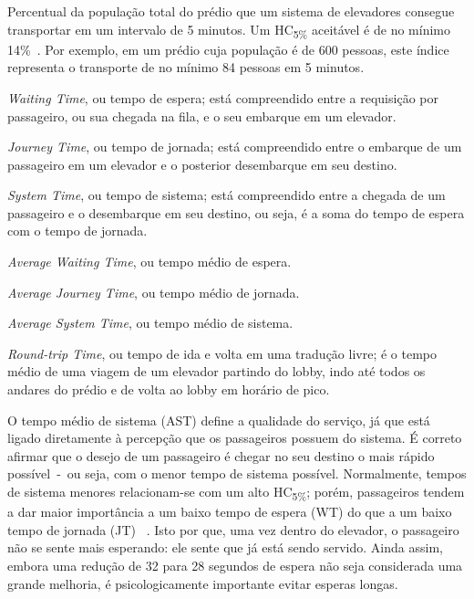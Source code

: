 \begin{description}[leftmargin=!,labelwidth=\widthof{\bfseries HC\textsubscript{5\%}}]\setlength\itemsep{0mm}
  \item[HC\textsubscript{5\%}]
  Percentual da população total do prédio que um sistema de elevadores consegue
  transportar em um intervalo de 5 minutos. Um HC\textsubscript{5\%} aceitável é
   de no mínimo 14\%~\cite{KOEHLEROTTIGER02}. Por exemplo, em um prédio cuja
   população é de 600 pessoas, este índice representa o transporte de no mínimo
   84 pessoas em 5 minutos.

  \item[WT]
  \textit{Waiting Time}, ou tempo de espera; está compreendido entre a
  requisição por passageiro, ou sua chegada na fila, e o seu embarque em um
  elevador.

  \item[JT]
  \textit{Journey Time}, ou tempo de jornada; está compreendido entre o embarque
   de um passageiro em um elevador e o posterior desembarque em seu destino.

  \item[ST]
  \textit{System Time}, ou tempo de sistema; está compreendido entre a
  chegada de um passageiro e o desembarque em seu destino, ou seja, é a soma do
  tempo de espera com o tempo de jornada.

  \item[AWT]
  \textit{Average Waiting Time}, ou tempo médio de espera.

  \item[AJT]
  \textit{Average Journey Time}, ou tempo médio de jornada.

  \item[AST]
  \textit{Average System Time}, ou tempo médio de sistema.

  \item[RTT]
  \textit{Round-trip Time}, ou tempo de ida e volta em uma tradução livre; é o
  tempo médio de uma viagem de um elevador partindo do lobby, indo até todos os
  andares do prédio e de volta ao lobby em horário de pico.
\end{description}

O tempo médio de sistema (AST) define a qualidade do serviço, já que está ligado
diretamente à percepção que os passageiros possuem do sistema. É correto afirmar
que o desejo de um passageiro é chegar no seu destino o mais rápido
possível~-~ou seja, com o menor tempo de sistema possível. Normalmente, tempos
de sistema menores relacionam-se com um alto HC\textsubscript{5\%}; porém,
passageiros tendem a dar maior importância a um baixo tempo de espera (WT) do
que a um baixo tempo de jornada (JT) ~\cite{KOEHLEROTTIGER02}. Isto por que, uma
vez dentro do elevador, o passageiro não se sente mais esperando: ele sente que
já está sendo servido. Ainda assim, embora uma redução de 32 para 28 segundos de
espera não seja considerada uma grande melhoria, é psicologicamente importante
evitar esperas longas.

